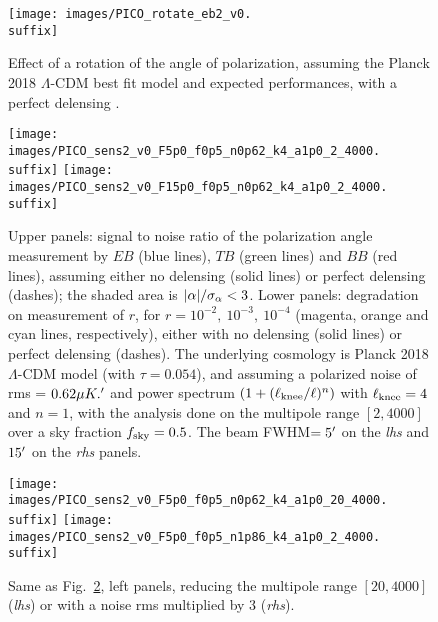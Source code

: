 \documentclass[PICOReport.tex]{subfiles}
\begin{document}
\begin{figure}[htb]
\texttt{[image: images/PICO\_rotate\_eb2\_v0.\\suffix]}
\caption{\label{fig:rot_bb_tb_eb} Effect of a rotation of the angle of polarization, assuming the Planck 2018 $\Lambda$-CDM best fit model \citep{Planck2018_VI} and expected \pico performances, with a perfect delensing .}
\end{figure}
%
\begin{figure}[htb]
\texttt{[image: images/PICO\_sens2\_v0\_F5p0\_f0p5\_n0p62\_k4\_a1p0\_2\_4000.\\suffix]}
\texttt{[image: images/PICO\_sens2\_v0\_F15p0\_f0p5\_n0p62\_k4\_a1p0\_2\_4000.\\suffix]}
\caption{\label{fig:rot_sens_0} Upper panels: signal to noise ratio of the polarization angle {\prang} measurement
by $EB$ (blue lines), $TB$ (green lines) and $BB$ (red lines), assuming either no delensing (solid lines) 
or perfect delensing (dashes); the shaded area is $|\alpha|/\sigma_{\alpha} < 3$.
Lower panels: degradation on measurement of $r$, for $r=10^{-2},\ 10^{-3},\ 10^{-4}$ (magenta, orange and cyan lines, respectively),
either with no delensing (solid lines) or perfect delensing (dashes).
The underlying cosmology is Planck 2018 $\Lambda$-CDM model (with $\tau = 0.054$), and assuming a polarized noise of rms = $0.62 \mu K.'$ and power spectrum $(1 + (\ell_{\rm knee}/\ell)^n)$ with $\ell_{\rm knee}=4$ and $n=1$, with the analysis done on the multipole range $[2,4000]$ over a sky fraction $f_{\rm sky}=0.5$. The beam FWHM$=5'$ on the \emph{lhs} and $15'$
on the \emph{rhs} panels.}
\end{figure}
%
%
\begin{figure}[htb]
\texttt{[image: images/PICO\_sens2\_v0\_F5p0\_f0p5\_n0p62\_k4\_a1p0\_20\_4000.\\suffix]}
\texttt{[image: images/PICO\_sens2\_v0\_F5p0\_f0p5\_n1p86\_k4\_a1p0\_2\_4000.\\suffix]}
\caption{\label{fig:rot_sens_2} Same as Fig.~\ref{fig:rot_sens_0}, left panels, reducing the multipole range $[20,4000]$ (\emph{lhs}) or with a noise rms multiplied by 3 (\emph{rhs}).}
\end{figure}
\end{document}
